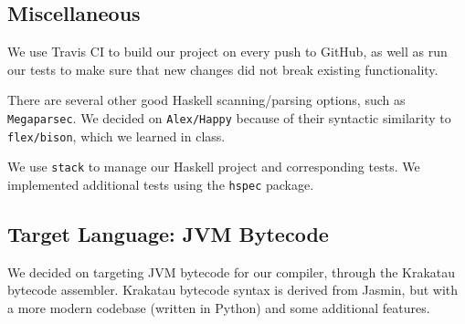 \documentclass[11pt]{article}
\begin{document}
\subsection{Miscellaneous}
We use Travis CI\cite{travisci} to build our project on every push to GitHub, as well
as run our tests to make sure that new changes did not break existing
functionality.

There are several other good Haskell scanning/parsing options, such as
\texttt{Megaparsec}. We decided on \texttt{Alex/Happy} because of
their syntactic similarity to \texttt{flex/bison}, which we learned in
class.

We use \texttt{stack}\cite{hs:stack} to manage our Haskell project and corresponding
tests.  We implemented additional tests using the \texttt{hspec}\cite{github:hspec}
package.


\subsection{Target Language: JVM Bytecode}
We decided on targeting JVM bytecode for our compiler, through the
Krakatau\cite{krakatau} bytecode
assembler. Krakatau bytecode syntax is derived from Jasmin, but with a
more modern codebase (written in Python) and some additional features.
\end{document}
